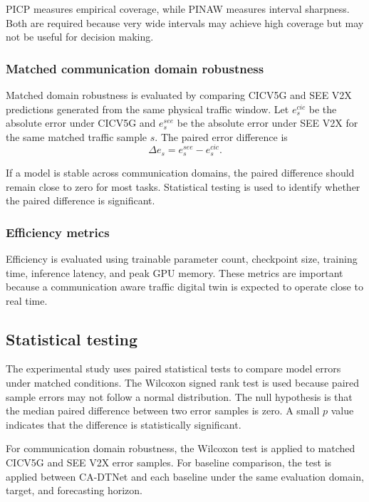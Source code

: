 \documentclass[pdflatex,sn-mathphys-num]{sn-jnl}%
\theoremstyle{thmstyleone}%
\theoremstyle{thmstyletwo}%
\theoremstyle{thmstylethree}%
\begin{document}
PICP measures empirical coverage, while PINAW measures interval sharpness. Both are required because very wide intervals may achieve high coverage but may not be useful for decision making.

\subsubsection{Matched communication domain robustness}

Matched domain robustness is evaluated by comparing CICV5G and SEE V2X predictions generated from the same physical traffic window. Let \(e_{s}^{cic}\) be the absolute error under CICV5G and \(e_{s}^{see}\) be the absolute error under SEE V2X for the same matched traffic sample \(s\). The paired error difference is
\begin{equation}
    \Delta e_s
    =
    e_{s}^{see}
    -
    e_{s}^{cic}.
\end{equation}

If a model is stable across communication domains, the paired difference should remain close to zero for most tasks. Statistical testing is used to identify whether the paired difference is significant.

\subsubsection{Efficiency metrics}

Efficiency is evaluated using trainable parameter count, checkpoint size, training time, inference latency, and peak GPU memory. These metrics are important because a communication aware traffic digital twin is expected to operate close to real time.

\subsection{Statistical testing}
\label{subsec:statistical_testing}

The experimental study uses paired statistical tests to compare model errors under matched conditions. The Wilcoxon signed rank test is used because paired sample errors may not follow a normal distribution. The null hypothesis is that the median paired difference between two error samples is zero. A small \(p\) value indicates that the difference is statistically significant.

For communication domain robustness, the Wilcoxon test is applied to matched CICV5G and SEE V2X error samples. For baseline comparison, the test is applied between CA-DTNet and each baseline under the same evaluation domain, target, and forecasting horizon.
\end{document}
